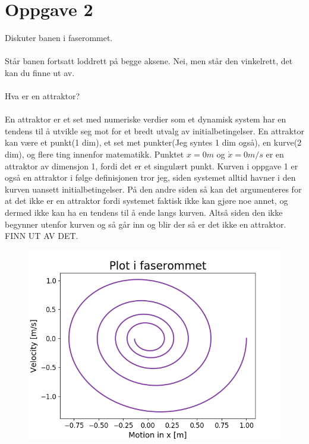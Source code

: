 \documentclass[norsk,a4paper,12pt]{article}
\begin{document}
\section*{Oppgave 2}
Diskuter banen i faserommet.
\\
\\
Står banen fortsatt loddrett på begge aksene. Nei, men står den vinkelrett, det kan du finne ut av.
\\
\\
Hva er en attraktor?
\\
\\
En attraktor er et set med numeriske verdier som et dynamisk system har en tendens til å utvikle seg mot for et bredt utvalg av initialbetingelser. En attraktor kan være et punkt(1 dim), et set met punkter(Jeg syntes 1 dim også), en kurve(2 dim), og flere ting innenfor matematikk. Punktet $x=0m$ og $\dot{x}=0m/s$ er en attraktor av dimensjon 1, fordi det er et singulært punkt. Kurven i oppgave 1 er også en attraktor i følge definisjonen tror jeg, siden systemet alltid havner i den kurven uansett initialbetingelser. På den andre siden så kan det argumenteres for at det ikke er en attraktor fordi systemet faktisk ikke kan gjøre noe annet, og dermed ikke kan ha en tendens til å ende langs kurven. Altså siden den ikke begynner utenfor kurven og så går inn og blir der så er det ikke en attraktor. FINN UT AV DET.



\begin{figure}[H]
\includegraphics[scale=0.8]{Oppgave2.png}
\end{figure}
\end{document}
